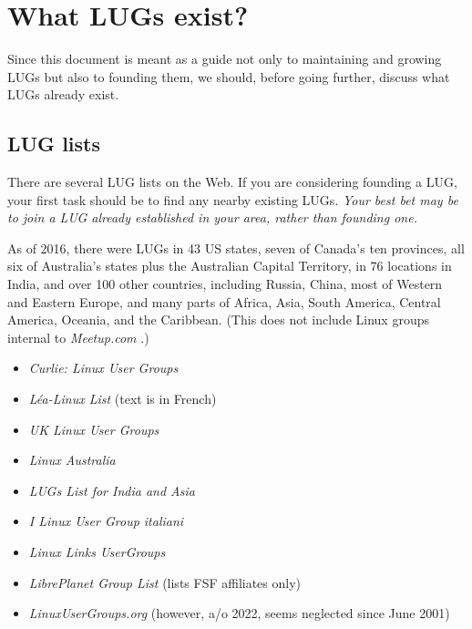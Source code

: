 

\section{What LUGs exist?}

Since this document is meant as a guide not only to maintaining and
growing LUGs but also to founding them, we should, before going further,
discuss what LUGs already exist.




\subsection{LUG lists}

There are several LUG lists on the Web. If you are considering founding a
LUG, your first task should be to find any nearby existing LUGs.
{\itshape Your best bet may be to join a LUG already established in your area,
rather than founding one.\/}

As of 2016, there were LUGs in 43 US states, seven of Canada's ten provinces, 
all six of Australia's states plus the Australian Capital Territory, in 76 
locations in India, and over 100 other countries, including Russia, China, most 
of Western and Eastern Europe, and many parts of Africa, Asia, South America, 
Central America, Oceania, and the Caribbean.  (This does not include Linux 
groups internal to 
\emph{Meetup.com} \texttt{\abyurl}
.)

\begin{itemize}
\item 
\emph{Curlie: Linux User Groups} \texttt{\abzurl}
\item 
\emph{L\'ea-Linux List} \texttt{\acaurl}
  (text is in French)
\item 
\emph{UK Linux User Groups} \texttt{\acburl}
\item 
\emph{Linux Australia} \texttt{\accurl}
\item 
\emph{LUGs List for India and Asia} \texttt{\acdurl}
\item 
\emph{I Linux User Group italiani} \texttt{\aceurl}
\item 
\emph{Linux Links UserGroups} \texttt{\acfurl}
\item 
\emph{LibrePlanet Group List} \texttt{\acgurl}
 (lists FSF affiliates only)
\item 
\emph{LinuxUserGroups.org} \texttt{\achurl}
 (however, a/o 2022, seems neglected since June 2001)
\end{itemize}





